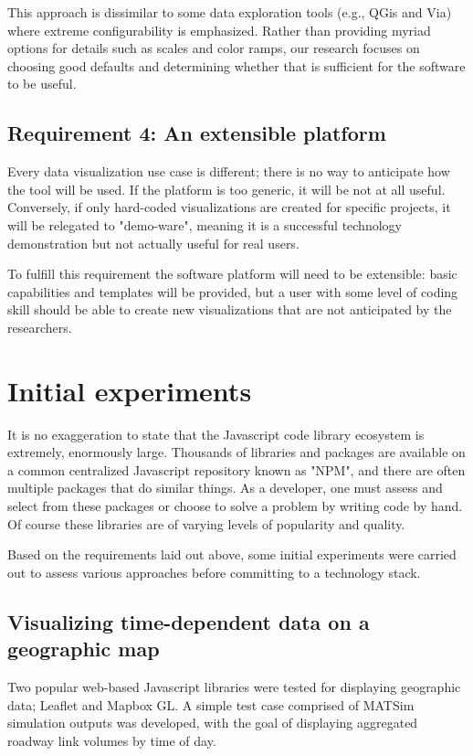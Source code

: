 \documentclass[Afour,sagev,times]{sagej}
\begin{document}
This approach is dissimilar to some data exploration tools (e.g., QGis and Via) where extreme configurability is emphasized. Rather than providing myriad options for details such as scales and color ramps, our research focuses on choosing good defaults and determining whether that is sufficient for the software to be
useful.

\subsection{Requirement 4: An extensible platform}

Every data visualization use case is different; there is no way to anticipate how the tool will be used. If the platform is too generic, it will be not at all useful. Conversely, if only hard-coded visualizations are created for specific projects, it will be relegated to "demo-ware", meaning it is a successful technology demonstration but not actually useful for real users.

To fulfill this requirement the software platform will need to be extensible: basic capabilities and templates will be provided, but a user with some level of coding skill should be able to create new visualizations that are not anticipated by the researchers.

\section{Initial experiments}

It is no exaggeration to state that the Javascript code library ecosystem is extremely, enormously large. Thousands of libraries and packages are available on a common centralized Javascript repository known as "NPM", and there are often multiple packages that do similar things. As a developer, one must assess and select from these packages or choose to solve a problem by writing code by hand. Of course these libraries are of varying levels of popularity and quality.

Based on the requirements laid out above, some initial experiments were carried out to assess various approaches before committing to a technology stack.

\subsection{Visualizing time-dependent data on a geographic map}

Two popular web-based Javascript libraries were tested for displaying geographic data; Leaflet and Mapbox GL. A simple test case comprised of MATSim simulation outputs was developed, with the goal of displaying aggregated roadway link volumes by time of day.
\end{document}
